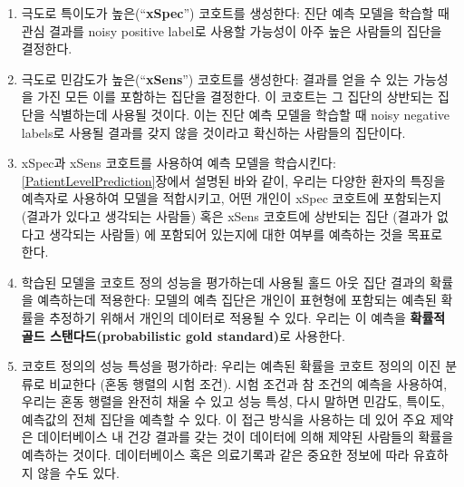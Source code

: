 \documentclass[11pt]{book}
\providecommand{\tightlist}{%
  \setlength{\itemsep}{0pt}\setlength{\parskip}{0pt}}
\theoremstyle{definition}
\theoremstyle{definition}
\theoremstyle{definition}
\theoremstyle{remark}
\begin{document}
\begin{enumerate}
\def\labelenumi{\arabic{enumi}.}
\tightlist
\item
  극도로 특이도가 높은(``\textbf{xSpec}'') 코호트를 생성한다: 진단 예측
  모델을 학습할 때 관심 결과를 noisy positive label로 사용할 가능성이
  아주 높은 사람들의 집단을 결정한다.
\item
  극도로 민감도가 높은(``\textbf{xSens}'') 코호트를 생성한다: 결과를
  얻을 수 있는 가능성을 가진 모든 이를 포함하는 집단을 결정한다. 이
  코호트는 그 집단의 상반되는 집단을 식별하는데 사용될 것이다. 이는 진단
  예측 모델을 학습할 때 noisy negative labels로 사용될 결과를 갖지 않을
  것이라고 확신하는 사람들의 집단이다.
\item
  xSpec과 xSens 코호트를 사용하여 예측 모델을 학습시킨다:
  \ref{PatientLevelPrediction}장에서 설명된 바와 같이, 우리는 다양한
  환자의 특징을 예측자로 사용하여 모델을 적합시키고, 어떤 개인이 xSpec
  코호트에 포함되는지 (결과가 있다고 생각되는 사람들) 혹은 xSens
  코호트에 상반되는 집단 (결과가 없다고 생각되는 사람들) 에 포함되어
  있는지에 대한 여부를 예측하는 것을 목표로 한다.
\item
  학습된 모델을 코호트 정의 성능을 평가하는데 사용될 홀드 아웃 집단
  결과의 확률을 예측하는데 적용한다: 모델의 예측 집단은 개인이 표현형에
  포함되는 예측된 확률을 추정하기 위해서 개인의 데이터로 적용될 수 있다.
  우리는 이 예측을 \textbf{확률적 골드 스탠다드(probabilistic gold
  standard)}로 사용한다.
\item
  코호트 정의의 성능 특성을 평가하라: 우리는 예측된 확률을 코호트 정의의
  이진 분류로 비교한다 (혼동 행렬의 시험 조건). 시험 조건과 참 조건의
  예측을 사용하여, 우리는 혼동 행렬을 완전히 채울 수 있고 성능 특성,
  다시 말하면 민감도, 특이도, 예측값의 전체 집단을 예측할 수 있다. 이
  접근 방식을 사용하는 데 있어 주요 제약은 데이터베이스 내 건강 결과를
  갖는 것이 데이터에 의해 제약된 사람들의 확률을 예측하는 것이다.
  데이터베이스 혹은 의료기록과 같은 중요한 정보에 따라 유효하지 않을
  수도 있다.
\end{enumerate}
\end{document}
